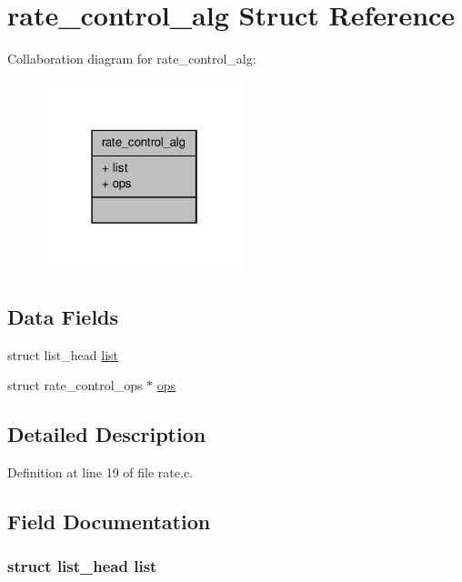 \hypertarget{structrate__control__alg}{\section{rate\-\_\-control\-\_\-alg Struct Reference}
\label{structrate__control__alg}
}


Collaboration diagram for rate\-\_\-control\-\_\-alg\-:
\nopagebreak
\begin{figure}[H]
\begin{center}
\leavevmode
\includegraphics[width=166pt]{structrate__control__alg__coll__graph}
\end{center}
\end{figure}
\subsection*{Data Fields}
\begin{DoxyCompactItemize}
\item 
struct list\-\_\-head \hyperlink{structrate__control__alg_a1f00f18b91d5a820f2c43064243aa86e}{list}
\item 
struct rate\-\_\-control\-\_\-ops $\ast$ \hyperlink{structrate__control__alg_ab4edfb3119eea89ac8b10fb2b542f6f8}{ops}
\end{DoxyCompactItemize}


\subsection{Detailed Description}


Definition at line 19 of file rate.\-c.



\subsection{Field Documentation}
\hypertarget{structrate__control__alg_a1f00f18b91d5a820f2c43064243aa86e}{
\subsubsection[{list}]{\setlength{\rightskip}{0pt plus 5cm}struct list\-\_\-head list}}\label{structrate__control__alg_a1f00f18b91d5a820f2c43064243aa86e}


